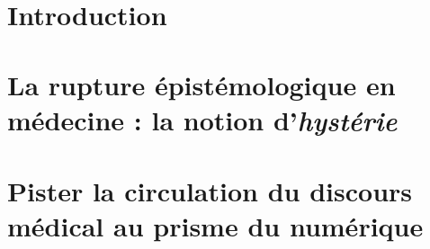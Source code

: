 \documentclass[a4paper,12pt]{report}
\begin{document}
\reversemarginpar %

\newcommand{\HRule}{\rule{\linewidth}{0.5mm}}


%
%
%
%
%

\cleardoublepage
{}
\tableofcontents
\thispagestyle{empty}
\setcounter{page}{0}

\newpage

\renewcommand{\arraystretch}{1.5}


~
\thispagestyle{empty}
\setcounter{page}{0}
\newpage



\chapter*{Introduction}


\chapter{La rupture épistémologique en médecine : la notion d'\textit{hystérie}}
\label{1_rupture}


\chapter{Pister la circulation du discours médical au prisme du numérique}
\label{2_sota}

\end{document}
